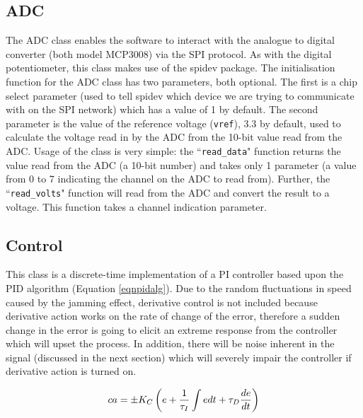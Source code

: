 \documentclass[twoside,a4]{report}
\def\br{\newline \newline \noindent}
\begin{document}
	\subsection*{ADC} %
	The ADC class enables the software to interact with the analogue to digital converter (both model MCP3008) via the SPI protocol. As with the digital potentiometer, this class makes use of the spidev package. \br
	The initialisation function for the ADC class has two parameters, both optional. The first is a chip select parameter (used to tell spidev which device we are trying to communicate with on the SPI network) which has a value of 1 by default. The second parameter is the value of the reference voltage (\texttt{vref}), 3.3 by default, used to calculate the voltage read in by the ADC from the 10-bit value read from the ADC. \br
	Usage of the class is very simple: the ``\texttt{read\_data}" function returns the value read from the ADC (a 10-bit number) and takes only 1 parameter (a value from 0 to 7 indicating the channel on the ADC to read from). Further, the ``\texttt{read\_volts}" function will read from the ADC and convert the result to a voltage. This function takes a channel indication parameter.
	
	\subsection*{Control} %
	This class is a discrete-time implementation of a PI controller based upon the PID algorithm (Equation \ref{eqnpidalg}). Due to the random fluctuations in speed caused by the jamming effect, derivative control is not included because derivative action works on the rate of change of the error, therefore a sudden change in the error is going to elicit an extreme response from  the controller which will upset the process. In addition, there will be noise inherent in the signal (discussed in the next section) which will severely impair the controller if derivative action is turned on. 
	
	\begin{equation}
	ca = \pm K_C \left(e + \frac{1}{\tau _I} \int e \space dt + \tau _D \frac{de}{dt}\right)
	\label{eqnpidalg}
	\end{equation}
	
	
\end{document}
